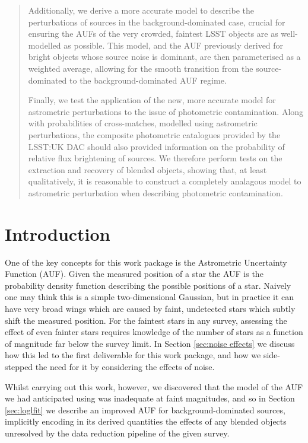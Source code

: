 \documentclass[fleqn,usenatbib]{mnras}
\begin{document}
\begin{abstract}
Additionally, we derive a more accurate model to describe the perturbations of sources in the background-dominated case, crucial for ensuring the AUFs of the very crowded, faintest LSST objects are as well-modelled as possible. This model, and the AUF previously derived for bright objects whose source noise is dominant, are then parameterised as a weighted average, allowing for the smooth transition from the source-dominated to the background-dominated AUF regime.  

Finally, we test the application of the new, more accurate model for astrometric perturbations to the issue of photometric contamination.
Along with probabilities of cross-matches, modelled using astrometric perturbations, the composite photometric catalogues provided by the LSST:UK DAC should also provided information on the probability of relative flux brightening of sources.
We therefore perform tests on the extraction and recovery of blended objects, showing that, at least qualitatively, it is reasonable to construct a completely analagous model to astrometric perturbation when describing photometric contamination.

\end{abstract}

\section{Introduction}

One of the key concepts for this work package is the Astrometric Uncertainty Function (AUF).
Given the measured position of a star the AUF is the probability density function describing the possible positions of a star.
Naively one may think this is a simple two-dimensional Gaussian, but in practice it can have very broad wings which are caused by faint, undetected stars which subtly shift the measured position.
For the faintest stars in any survey, assessing the effect of even fainter stars requires knowledge of the number of stars as a function of magnitude far below the survey limit.
In Section \ref{sec:noise effects} we discuss how this led to the first deliverable for this work package, and how we side-stepped the need for it by considering the effects of noise.

Whilst carrying out this work, however, we discovered that the model of the AUF we had anticipated using was inadequate at faint magnitudes, and so in Section \ref{sec:loglfit} we describe an improved AUF for background-dominated sources, implicitly encoding in its derived quantities the effects of any blended objects unresolved by the data reduction pipeline of the given survey.
\end{document}
